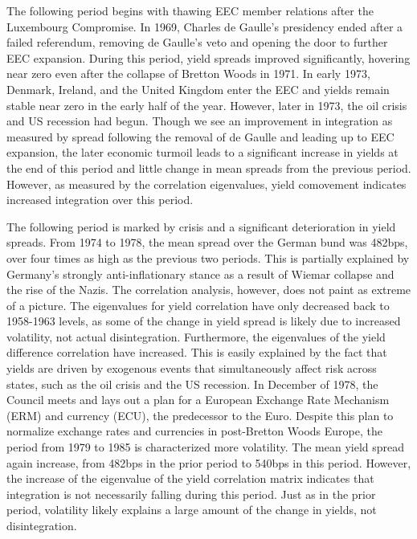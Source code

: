 \documentclass[3p]{elsarticle}
\begin{document}
The following period begins with thawing EEC member relations after the Luxembourg Compromise.  In 1969, Charles de Gaulle's presidency ended after a failed referendum, removing de Gaulle's veto and opening the door to further EEC expansion.  During this period, yield spreads improved significantly, hovering near zero even after the collapse of Bretton Woods in 1971.  In early 1973, Denmark, Ireland, and the United Kingdom enter the EEC and yields remain stable near zero in the early half of the year.  However, later in 1973, the oil crisis and US recession had begun.  Though we see an improvement in integration as measured by spread following the removal of de Gaulle and leading up to EEC expansion, the later economic turmoil leads to a significant increase in yields at the end of this period and little change in mean spreads from the previous period.  However, as measured by the correlation eigenvalues, yield comovement indicates increased integration over this period.

The following period is marked by crisis and a significant deterioration in yield spreads.  From 1974 to 1978, the mean spread over the German bund was 482bps, over four times as high as the previous two periods.  This is partially explained by Germany's strongly anti-inflationary stance as a result of Wiemar collapse and the rise of the Nazis.  The correlation analysis, however, does not paint as extreme of a picture.  The eigenvalues for yield correlation have only decreased back to 1958-1963 levels, as some of the change in yield spread is likely due to increased volatility, not actual disintegration.  Furthermore, the eigenvalues of the yield difference correlation have increased.  This is easily explained by the fact that yields are driven by exogenous events that simultaneously affect risk across states, such as the oil crisis and the US recession.  In December of 1978, the Council meets and lays out a plan for a European Exchange Rate Mechanism (ERM) and currency (ECU), the predecessor to the Euro.  Despite this plan to normalize exchange rates and currencies  in post-Bretton Woods Europe, the period from 1979 to 1985 is characterized more volatility.  The mean yield spread again increase, from 482bps in the prior period to 540bps in this period.  However, the increase of the eigenvalue of the yield correlation matrix indicates that integration is not necessarily falling during this period.  Just as in the prior period, volatility likely explains a large amount of the change in yields, not disintegration.
\end{document}
